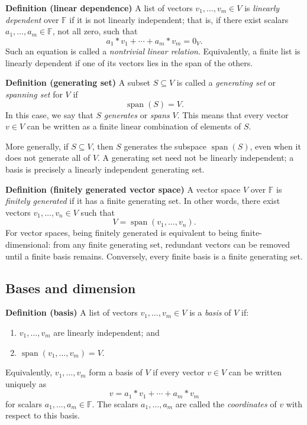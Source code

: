 \documentclass[a4paper,11pt,abstract=true]{scrartcl}
\theoremstyle{dotlessP}
\theoremstyle{dotlessS}
\theoremstyle{remark}
\theoremstyle{definition}
\begin{document}
\begin{definition_box}
\textbf{Definition (linear dependence)} A list of vectors
$v_1,\ldots,v_m\in V$ is \emph{linearly dependent} over $\mathbb{F}$ if it is not
linearly independent; that is, if there exist scalars
$a_1,\ldots,a_m\in \mathbb{F}$, not all zero, such that
\[
a_1*v_1+\cdots+a_m*v_m=0_V.
\]
Such an equation is called a \emph{nontrivial linear relation}. Equivalently,
a finite list is linearly dependent if one of its vectors lies in the span of
the others.
\end{definition_box}


\textbf{Definition (generating set)} A subset $S\subseteq V$ is called a
\emph{generating set} or \emph{spanning set} for $V$ if
\[
\operatorname{span}(S)=V.
\]
In this case, we say that $S$ \emph{generates} or \emph{spans} $V$. This
means that every vector $v\in V$ can be written as a finite linear
combination of elements of $S$.

More generally, if $S\subseteq V$, then $S$ generates the subspace
$\operatorname{span}(S)$, even when it does not generate all of $V$. A
generating set need not be linearly independent; a basis is precisely a
linearly independent generating set.



\textbf{Definition (finitely generated vector space)} A vector space $V$
over $\mathbb{F}$ is \emph{finitely generated} if it has a finite generating set. In
other words, there exist vectors $v_1,\ldots,v_n\in V$ such that
\[
V=\operatorname{span}(v_1,\ldots,v_n).
\]
For vector spaces, being finitely generated is equivalent to being
finite-dimensional: from any finite generating set, redundant vectors can be
removed until a finite basis remains. Conversely, every finite basis is a
finite generating set.


\subsection{Bases and dimension}
\begin{definition_box}
\textbf{Definition (basis)} A list of vectors
$v_1,\ldots,v_m\in V$ is a \emph{basis} of $V$ if:
\begin{enumerate}
    \item $v_1,\ldots,v_m$ are linearly independent; and
    \item $\operatorname{span}(v_1,\ldots,v_m)=V$.
\end{enumerate}
Equivalently, $v_1,\ldots,v_m$ form a basis of $V$ if every vector $v\in V$
can be written uniquely as
\[
v=a_1*v_1+\cdots+a_m*v_m
\]
for scalars $a_1,\ldots,a_m\in \mathbb{F}$. The scalars $a_1,\ldots,a_m$ are called
the \emph{coordinates} of $v$ with respect to this basis.
\end{definition_box}
\end{document}
